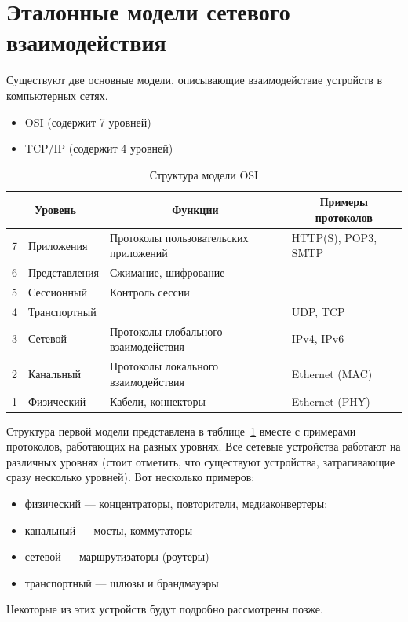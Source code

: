 \section{Эталонные модели сетевого взаимодействия}
Существуют две основные модели, описывающие взаимодействие устройств в компьютерных сетях.
\begin{itemize}
	\item OSI (содержит 7 уровней)
	\item TCP/IP (содержит 4 уровней)
\end{itemize}
\begin{table}[h!]
	\centering
	\begin{tabular}{|l|l|l|l|}
		\hline
			\multicolumn{2}{|c|}{Уровень} & \multicolumn{1}{c|}{Функции} & \multicolumn{1}{c|}{Примеры протоколов} \\ \hline
			7 & Приложения & Протоколы пользовательских приложений & HTTP(S), POP3, SMTP \\ \hline
			6 & Представления & Сжимание, шифрование &  \\ \hline
			5 & Сессионный & Контроль сессии &  \\ \hline
			4 & Транспортный &  & UDP, TCP \\ \hline
			3 & Сетевой & Протоколы глобального взаимодействия & IPv4, IPv6 \\ \hline
			2 & Канальный & Протоколы локального взаимодействия & Ethernet (MAC) \\ \hline
			1 & Физический & Кабели, коннекторы & Ethernet (PHY) \\ \hline
	\end{tabular}
	\caption{Структура модели OSI}
	\label{tbl:osi}
\end{table}
Структура первой модели представлена в таблице~\ref{tbl:osi} вместе с примерами протоколов, работающих на разных уровнях. Все сетевые устройства работают на различных уровнях (стоит отметить, что существуют устройства, затрагивающие сразу несколько уровней). Вот несколько примеров:
\begin{itemize}
	\item физический --- концентраторы, повторители, медиаконвертеры;
	\item канальный --- мосты, коммутаторы
	\item сетевой --- маршрутизаторы (роутеры)
	\item транспортный --- шлюзы и брандмауэры
\end{itemize}
Некоторые из этих устройств будут подробно рассмотрены позже.
